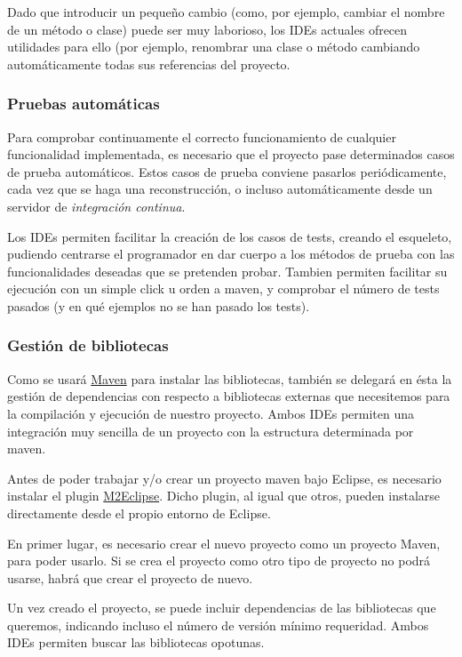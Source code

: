 \documentclass[11pt]{article}
\begin{document}
Dado que introducir un pequeño cambio (como, por ejemplo, cambiar el nombre de
un método o clase) puede ser muy laborioso, los IDEs actuales ofrecen utilidades
para ello (por ejemplo, renombrar una clase o método cambiando automáticamente
todas sus referencias del proyecto.

\subsubsection{Pruebas automáticas} \label{sec-3-2-4}

Para comprobar continuamente el correcto funcionamiento de cualquier
funcionalidad implementada, es necesario que el proyecto pase determinados casos
de prueba automáticos. Estos casos de prueba conviene pasarlos periódicamente,
cada vez que se haga una reconstrucción, o incluso automáticamente desde un
servidor de \emph{integración continua}.

Los IDEs permiten facilitar la creación de los casos de tests, creando el
esqueleto, pudiendo centrarse el programador en dar cuerpo a los métodos de
prueba con las funcionalidades deseadas que se pretenden probar. Tambien
permiten facilitar su ejecución con un simple click u orden a maven, y comprobar
el número de tests pasados (y en qué ejemplos no se han pasado los tests).

\subsubsection{Gestión de bibliotecas} \label{sec-3-2-5}

Como se usará \hyperref[sec-5]{Maven} para instalar las bibliotecas, también se
delegará en ésta la gestión de dependencias con respecto a bibliotecas externas
que necesitemos para la compilación y ejecución de nuestro proyecto. Ambos IDEs
permiten una integración muy sencilla de un proyecto con la estructura
determinada por maven.

Antes de poder trabajar y/o crear un proyecto maven bajo Eclipse, es necesario
instalar el plugin \href{http://m2eclipse.sonatype.org/}{M2Eclipse}. Dicho
plugin, al igual que otros, pueden instalarse directamente desde el propio
entorno de Eclipse.

En primer lugar, es necesario crear el nuevo proyecto como un proyecto Maven,
para poder usarlo. Si se crea el proyecto como otro tipo de proyecto no podrá
usarse, habrá que crear el proyecto de nuevo.

Un vez creado el proyecto, se puede incluir dependencias de las bibliotecas que
queremos, indicando incluso el número de versión mínimo requeridad. Ambos IDEs
permiten buscar las bibliotecas opotunas.
\end{document}
